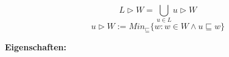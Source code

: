 \documentclass[11pt]{article}
\author{Robert Hartmann}
\begin{document}
$$L\triangleright W = \bigcup_{u\in L} u\triangleright W$$
\vspace{5mm}
$$u\triangleright W := Min_{\sqsubseteq} \{w:w\in W \wedge u\sqsubseteq w\}$$

\textbf{\large{Eigenschaften:}}\\\\
\end{document}
